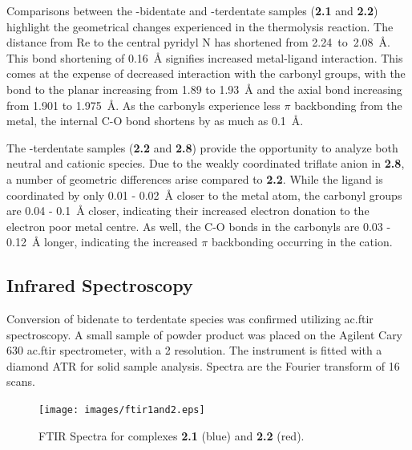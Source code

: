 Comparisons between the -bidentate and -terdentate samples (\textbf{2.1} and \textbf{2.2}) highlight the geometrical changes experienced in the thermolysis reaction. The distance from Re to the central pyridyl N has shortened from 2.24~to~2.08~\r{A}. This bond shortening of 0.16~\r{A} signifies increased metal-ligand interaction. This comes at the expense of decreased interaction with the carbonyl groups, with the bond to the planar  increasing from 1.89 to 1.93~\r{A} and the axial  bond increasing from 1.901 to 1.975~\r{A}. As the carbonyls experience less $\pi$ backbonding from the metal, the internal C-O bond shortens by as much as 0.1~\r{A}. 

The -terdentate samples (\textbf{2.2} and \textbf{2.8}) provide the opportunity to analyze both neutral and cationic species. Due to the weakly coordinated triflate anion in \textbf{2.8}, a number of geometric differences arise compared to \textbf{2.2}. While the ligand is coordinated by only 0.01 - 0.02~\r{A} closer to the metal atom, the carbonyl groups are 0.04 - 0.1~\r{A} closer, indicating their increased electron donation to the electron poor metal centre. As well, the C-O bonds in the carbonyls are 0.03 - 0.12~\r{A} longer, indicating the increased $\pi$ backbonding occurring in the cation.  





\FloatBarrier

\subsection{Infrared Spectroscopy}

Conversion of bidenate to terdentate species was confirmed utilizing \gls{ac.ftir} spectroscopy. A small sample of powder product was placed on the Agilent Cary 630 \gls{ac.ftir} spectrometer, with a 2  resolution. The instrument is fitted with a diamond ATR for solid sample analysis. Spectra are the Fourier transform of 16 scans.

\begin{figure}[!htb]
 \begin{center}
  \texttt{[image: images/ftir1and2.eps]}
 \end{center}
\caption[FTIR Spectra for complexes \textbf{2.1} and \textbf{2.2}]{FTIR Spectra for complexes \textbf{2.1} (blue) and \textbf{2.2} (red).}
\label{fig.ir1}
\end{figure} 

